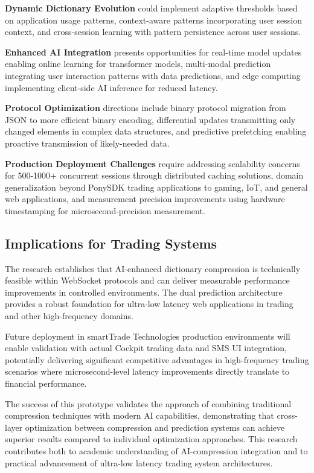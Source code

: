 \documentclass[12pt,a4paper]{article}
\begin{document}
\textbf{Dynamic Dictionary Evolution} could implement adaptive thresholds based on application usage patterns, context-aware patterns incorporating user session context, and cross-session learning with pattern persistence across user sessions.

\textbf{Enhanced AI Integration} presents opportunities for real-time model updates enabling online learning for transformer models, multi-modal prediction integrating user interaction patterns with data predictions, and edge computing implementing client-side AI inference for reduced latency.

\textbf{Protocol Optimization} directions include binary protocol migration from JSON to more efficient binary encoding, differential updates transmitting only changed elements in complex data structures, and predictive prefetching enabling proactive transmission of likely-needed data.

\textbf{Production Deployment Challenges} require addressing scalability concerns for 500-1000+ concurrent sessions through distributed caching solutions, domain generalization beyond PonySDK trading applications to gaming, IoT, and general web applications, and measurement precision improvements using hardware timestamping for microsecond-precision measurement.

\subsection{Implications for Trading Systems}

The research establishes that AI-enhanced dictionary compression is technically feasible within WebSocket protocols and can deliver measurable performance improvements in controlled environments. The dual prediction architecture provides a robust foundation for ultra-low latency web applications in trading and other high-frequency domains.

Future deployment in smartTrade Technologies production environments will enable validation with actual Cockpit trading data and SMS UI integration, potentially delivering significant competitive advantages in high-frequency trading scenarios where microsecond-level latency improvements directly translate to financial performance.

The success of this prototype validates the approach of combining traditional compression techniques with modern AI capabilities, demonstrating that cross-layer optimization between compression and prediction systems can achieve superior results compared to individual optimization approaches. This research contributes both to academic understanding of AI-compression integration and to practical advancement of ultra-low latency trading system architectures.
\end{document}

